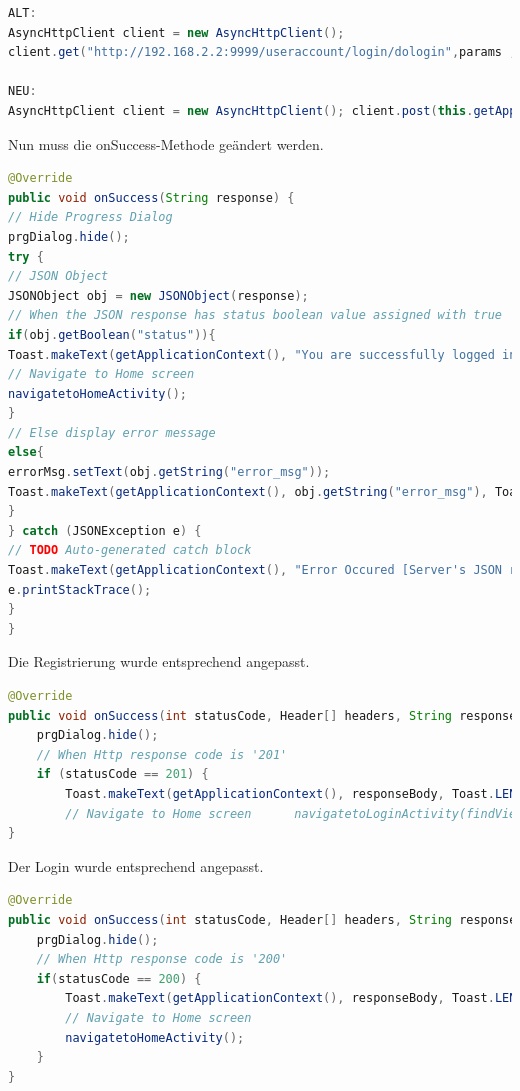 \begin{lstlisting}[frame=single, language=java, caption=Ändern des AsyncHttpClients]
ALT:
AsyncHttpClient client = new AsyncHttpClient();
client.get("http://192.168.2.2:9999/useraccount/login/dologin",params ,new AsyncHttpResponseHandler()

NEU:
AsyncHttpClient client = new AsyncHttpClient(); client.post(this.getApplicationContext(), "http://10.0.2.2:8080/register", request, "application/json", new TextHttpResponseHandler() {
\end{lstlisting}

Nun muss die onSuccess-Methode geändert werden.
\begin{lstlisting}[frame=single, language=java, caption=onSuccess Methode]
@Override
public void onSuccess(String response) {
// Hide Progress Dialog
prgDialog.hide();
try {
// JSON Object
JSONObject obj = new JSONObject(response);
// When the JSON response has status boolean value assigned with true
if(obj.getBoolean("status")){
Toast.makeText(getApplicationContext(), "You are successfully logged in!", Toast.LENGTH_LONG).show();
// Navigate to Home screen
navigatetoHomeActivity();
}
// Else display error message
else{
errorMsg.setText(obj.getString("error_msg"));
Toast.makeText(getApplicationContext(), obj.getString("error_msg"), Toast.LENGTH_LONG).show();
}
} catch (JSONException e) {
// TODO Auto-generated catch block
Toast.makeText(getApplicationContext(), "Error Occured [Server's JSON response might be invalid]!", Toast.LENGTH_LONG).show();
e.printStackTrace();
}
}
\end{lstlisting}

Die Registrierung wurde entsprechend angepasst.
\begin{lstlisting}[frame=single, language=java, caption=Neue Registrierung]
@Override
public void onSuccess(int statusCode, Header[] headers, String responseBody) {
	prgDialog.hide();
	// When Http response code is '201'
	if (statusCode == 201) {
		Toast.makeText(getApplicationContext(), responseBody, Toast.LENGTH_LONG).show();
		// Navigate to Home screen 		navigatetoLoginActivity(findViewById(android.R.id.content)); 	}
}
\end{lstlisting}

Der Login wurde entsprechend angepasst.
\begin{lstlisting}[frame=single, language=java, caption=Neue Registrierung]
@Override
public void onSuccess(int statusCode, Header[] headers, String responseBody) {
	prgDialog.hide();
	// When Http response code is '200'
	if(statusCode == 200) {
		Toast.makeText(getApplicationContext(), responseBody, Toast.LENGTH_LONG).show();
		// Navigate to Home screen
		navigatetoHomeActivity();
	}
}
\end{lstlisting}

